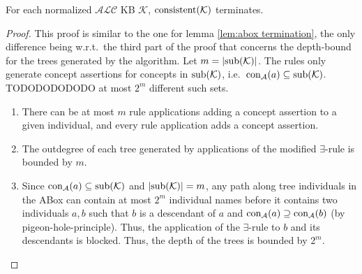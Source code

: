 \begin{lemma}[Termination]
	For each normalized $\mathcal{ALC}$ KB $\mathcal{K}$, $\operatorname{\text{consistent}}(\mathcal{K})$ terminates.
\end{lemma}
\begin{proof}
	This proof is similar to the one for lemma \ref{lem:abox termination},
	the only difference being w.r.t.\ the third part of the proof
	that concerns the depth-bound for the trees generated by the algorithm.
	Let $m = \lvert \operatorname{\text{sub}}(\mathcal{K}) \rvert$.
	The rules only generate concept assertions for concepts in $\operatorname{\text{sub}}(\mathcal{K})$,
	i.e.\ $\operatorname{\text{con}}_{\mathcal{A}}(a) \subseteq \operatorname{\text{sub}}(\mathcal{K})$.
	TODODODODODO at most $2^m$ different such sets.
	\begin{enumerate}
		\item There can be at most $m$ rule applications adding a concept assertion to a given individual,
			and every rule application adds a concept assertion.
		\item The outdegree of each tree generated by applications of the modified $\exists$-rule is bounded by $m$.
		\item Since $\operatorname{\text{con}}_{\mathcal{A}}(a) \subseteq \operatorname{\text{sub}}(\mathcal{K})$ and $\lvert \operatorname{\text{sub}}(\mathcal{K}) \rvert = m$,
			any path along tree individuals in the ABox can contain at most $2^m$ individual names
			before it contains two individuals $a, b$ such that $b$ is a descendant of $a$ and
			$\operatorname{\text{con}}_{\mathcal{A}}(a) \supseteq \operatorname{\text{con}}_{\mathcal{A}}(b)$ (by pigeon-hole-principle).
			Thus, the application of the $\exists$-rule to $b$ and its descendants is blocked.
			Thus, the depth of the trees is bounded by $2^m$.
			\qedhere
	\end{enumerate}
\end{proof}

